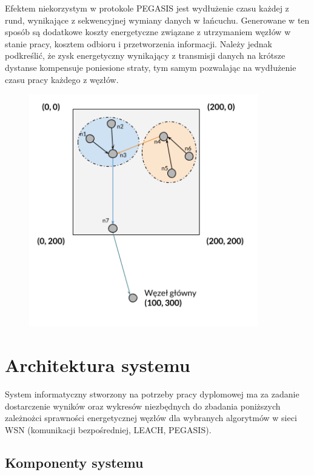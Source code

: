 \documentclass[a4paper,12pt,twoside,openany]{report}
\begin{document}
Efektem niekorzystym w protokole PEGASIS jest wydłużenie czasu każdej z rund, wynikające z sekwencyjnej wymiany danych w łańcuchu.
Generowane w ten sposób są dodatkowe koszty energetyczne związane z utrzymaniem węzłów w stanie pracy, kosztem odbioru i przetworzenia informacji.
Należy jednak podkreślić, że zysk energetyczny wynikający z transmisji danych na krótsze dystanse kompensuje poniesione straty, tym samym pozwalając na wydłużenie czasu pracy każdego z węzłów.

\begin{figure}[H]
 \centering
 \includegraphics[width=10cm]{images/komunikacja_pegasis.png} 
\end{figure}

\chapter{Architektura systemu}

System informatyczny stworzony na potrzeby pracy dyplomowej ma za zadanie dostarczenie wyników oraz wykresów niezbędnych do zbadania poniższych zależnożci sprawności energetycznej 
węzłów dla wybranych algorytmów w sieci WSN (komunikacji bezpośredniej, LEACH, PEGASIS).

\section{Komponenty systemu}
\end{document}
